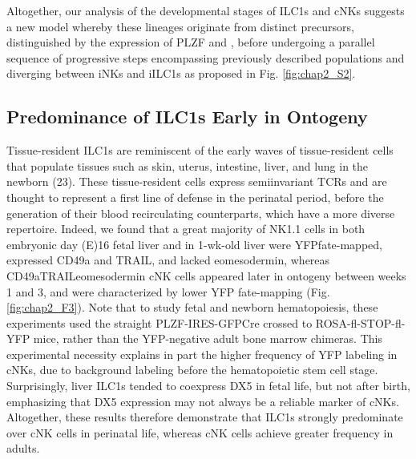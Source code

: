 Altogether, our analysis of the developmental stages of ILC1s and cNKs suggests a new model whereby these lineages originate from distinct precursors, distinguished by the expression of PLZF and \ab, before undergoing a parallel sequence of progressive steps encompassing previously described populations and diverging between iNKs and iILC1s as proposed in Fig. \ref{fig:chap2_S2}.

\subsection{Predominance of ILC1s Early in Ontogeny}

Tissue-resident ILC1s are reminiscent of the early waves of tissue-resident \gdT cells that populate tissues such as skin, uterus, intestine, liver, and lung in the newborn (23). These tissue-resident \gdT cells express semiinvariant TCRs and are thought to represent a first line of defense in the perinatal period, before the generation of their blood recirculating counterparts, which have a more diverse repertoire. Indeed, we found that a great majority of \CDte\UM NK1.1\UP{} cells in both embryonic day (E)16 fetal liver and in 1-wk-old liver were YFP\UP fate-mapped, expressed CD49a and TRAIL, and lacked eomesodermin, whereas CD49a\UM TRAIL\UM eomesodermin\UP{} cNK cells appeared later in ontogeny between weeks 1 and 3, and were characterized by lower YFP fate-mapping (Fig. \ref{fig:chap2_F3}). Note that to study fetal and newborn hematopoiesis, these experiments used the straight PLZF-IRES-GFPCre crossed to ROSA-fl-STOP-fl-YFP mice, rather than the YFP-negative adult bone marrow chimeras. This experimental necessity explains in part the higher frequency of YFP labeling in cNKs, due to background labeling before the hematopoietic stem cell stage. Surprisingly, liver ILC1s tended to coexpress DX5 in fetal life, but not after birth, emphasizing that DX5 expression may not always be a reliable marker of cNKs. Altogether, these results therefore demonstrate that ILC1s strongly predominate over cNK cells in perinatal life, whereas cNK cells achieve greater frequency in adults.

